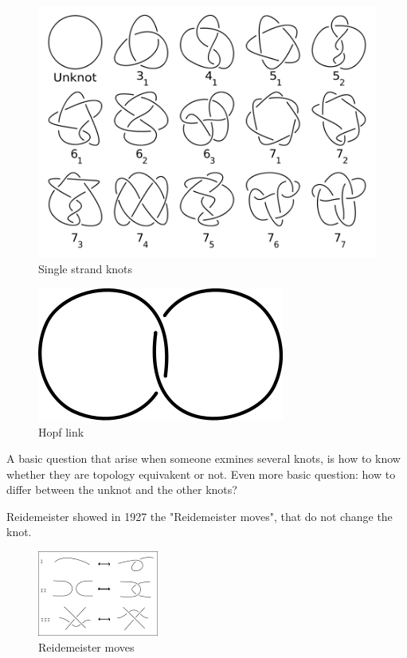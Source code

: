 \documentclass{article}
\begin{document}
\begin{figure}
\centering
\includegraphics[scale=0.25]{470px-Knot_table}
\caption{Single strand knots}
\label{fig:my_label}
\end{figure}

\begin{figure}
\includegraphics[scale=0.25]{307px-Hopf_link} 
\caption{Hopf link}
\end{figure}

A basic question that arise when someone exmines several knots, is how to know whether they are topology equivakent or not. Even more basic question: how to differ between the unknot and the other knots?

Reidemeister showed in 1927 the "Reidemeister moves", that do not change the knot.
\begin{figure}
\includegraphics[scale=1]{Reidemeister} 
\caption{Reidemeister moves}
\end{figure}
\end{document}
